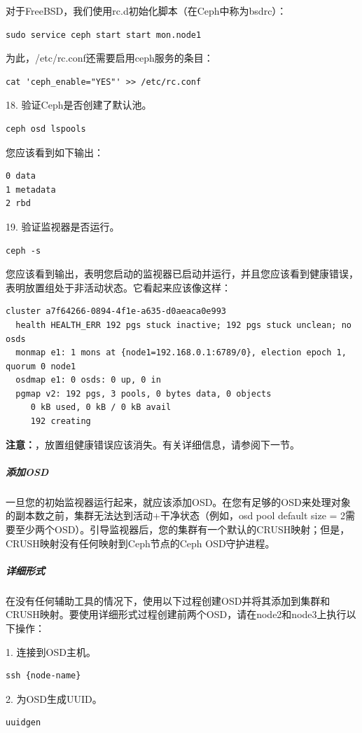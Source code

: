 \documentclass[12pt,UTF8]{ctexbook}
\begin{document}
对于FreeBSD，我们使用rc.d初始化脚本（在Ceph中称为bsdrc）：
\begin{verbatim}
sudo service ceph start start mon.node1
\end{verbatim}

为此，/etc/rc.conf还需要启用ceph服务的条目：
\begin{verbatim}
cat 'ceph_enable="YES"' >> /etc/rc.conf
\end{verbatim}

18. 验证Ceph是否创建了默认池。
\begin{verbatim}
ceph osd lspools
\end{verbatim}

您应该看到如下输出：
\begin{verbatim}
0 data
1 metadata
2 rbd
\end{verbatim}

19. 验证监视器是否运行。
\begin{verbatim}
ceph -s
\end{verbatim}

您应该看到输出，表明您启动的监视器已启动并运行，并且您应该看到健康错误，表明放置组处于非活动状态。它看起来应该像这样：
\begin{verbatim}
cluster a7f64266-0894-4f1e-a635-d0aeaca0e993
  health HEALTH_ERR 192 pgs stuck inactive; 192 pgs stuck unclean; no osds
  monmap e1: 1 mons at {node1=192.168.0.1:6789/0}, election epoch 1, quorum 0 node1
  osdmap e1: 0 osds: 0 up, 0 in
  pgmap v2: 192 pgs, 3 pools, 0 bytes data, 0 objects
     0 kB used, 0 kB / 0 kB avail
     192 creating
\end{verbatim}

\textbf{注意：}，放置组健康错误应该消失。有关详细信息，请参阅下一节。

\subparagraph{添加OSD}
一旦您的初始监视器运行起来，就应该添加OSD。在您有足够的OSD来处理对象的副本数之前，集群无法达到活动+干净状态（例如，osd pool default size = 2需要至少两个OSD）。引导监视器后，您的集群有一个默认的CRUSH映射；但是，CRUSH映射没有任何映射到Ceph节点的Ceph OSD守护进程。

\subparagraph{详细形式}
在没有任何辅助工具的情况下，使用以下过程创建OSD并将其添加到集群和CRUSH映射。要使用详细形式过程创建前两个OSD，请在node2和node3上执行以下操作：

1. 连接到OSD主机。
\begin{verbatim}
ssh {node-name}
\end{verbatim}

2. 为OSD生成UUID。
\begin{verbatim}
uuidgen
\end{verbatim}
\end{document}
